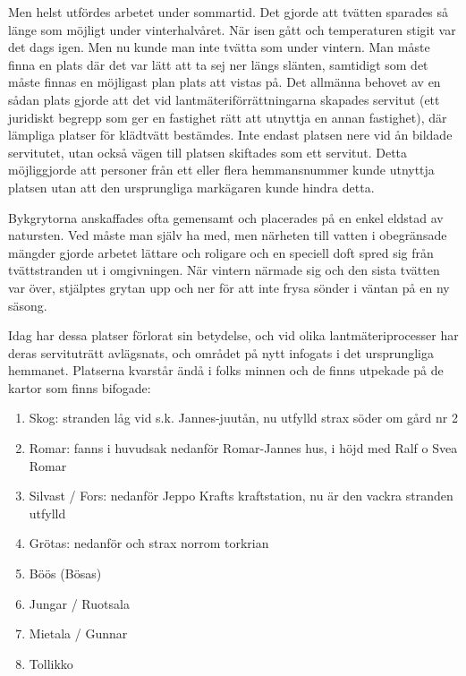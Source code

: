 Men helst utfördes arbetet under sommartid. Det gjorde att tvätten sparades så länge som möjligt under vinterhalvåret. När isen gått och temperaturen stigit var det dags igen. Men nu kunde man inte tvätta som under vintern. Man måste finna en plats där det var lätt att ta sej ner längs slänten, samtidigt som det måste finnas en möjligast plan plats att vistas på. Det allmänna behovet av en sådan plats gjorde att det vid lantmäteriförrättningarna skapades servitut (ett juridiskt begrepp som ger en fastighet rätt att utnyttja en annan fastighet), där lämpliga platser för klädtvätt bestämdes. Inte endast platsen nere vid ån bildade servitutet, utan också vägen till platsen skiftades som ett servitut. Detta möjliggjorde att personer från ett eller flera hemmansnummer kunde utnyttja platsen utan att den ursprungliga markägaren kunde hindra detta.

Bykgrytorna anskaffades ofta gemensamt och placerades på en enkel eldstad av natursten. Ved måste man själv ha med, men närheten till vatten i obegränsade mängder gjorde arbetet lättare och roligare och en speciell doft spred sig från tvättstranden ut i omgivningen. När vintern närmade sig och den sista tvätten var över, stjälptes grytan upp och ner för att inte frysa sönder i väntan på en ny säsong.

Idag har dessa platser förlorat sin betydelse, och vid olika lantmäteriprocesser har deras servituträtt avlägsnats, och området på nytt infogats i det ursprungliga hemmanet. Platserna kvarstår ändå i folks minnen och de finns utpekade på de kartor som finns bifogade:
\begin{enumerate}
  \item Skog: stranden låg vid s.k. Jannes-juutån, nu utfylld strax söder om gård nr 2
  \item Romar: fanns i huvudsak nedanför Romar-Jannes hus, i höjd med Ralf o Svea Romar
  \item Silvast / Fors: nedanför Jeppo Krafts kraftstation, nu är den vackra stranden utfylld
  \item Grötas: nedanför och strax norrom torkrian
  \item Böös (Bösas)
  \item Jungar / Ruotsala
  \item Mietala / Gunnar
  \item Tollikko
\end{enumerate}
